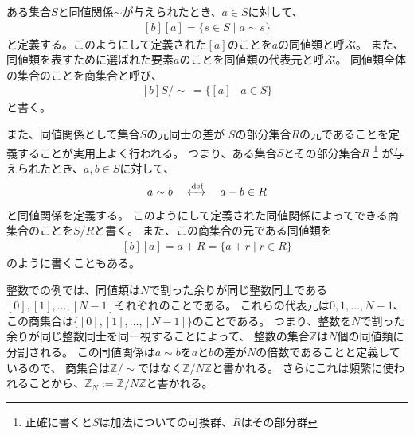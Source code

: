 \documentclass[../master.tex]{subfiles}
\begin{document}
\begin{NoteBox}[title=同値類と商集合]{}
    ある集合$S$と同値関係$\sim$が与えられたとき、$a\in S$に対して、
    \begin{equation}\begin{aligned}[b]
        [a] = \{s\in S \mid a \sim s\}
    \end{aligned}\end{equation}
    と定義する。このようにして定義された$[a]$のことを$a$の同値類と呼ぶ。
    また、同値類を表すために選ばれた要素$a$のことを同値類の代表元と呼ぶ。
    同値類全体の集合のことを商集合と呼び、
    \begin{equation}\begin{aligned}[b]
        S/\sim\, = \{[a] \mid a\in S\}
    \end{aligned}\end{equation}
    と書く。

    また、同値関係として集合$S$の元同士の差が
    $S$の部分集合$R$の元であることを定義することが実用上よく行われる。
    つまり、ある集合$S$とその部分集合$R$
    \footnote{正確に書くと$S$は加法についての可換群、$R$はその部分群}
    が与えられたとき、$a,b\in S$に対して、
    \begin{equation}\begin{aligned}[b]
        a \sim b \quad \xleftrightarrow{\text{def}} \quad a - b \in R
    \end{aligned}\end{equation}
    と同値関係を定義する。
    このようにして定義された同値関係によってできる商集合のことを$S/R$と書く。
    また、この商集合の元である同値類を
    \begin{equation}\begin{aligned}[b]
        [a] = a+R = \{a+r \mid r\in R\}
    \end{aligned}\end{equation}
    のように書くこともある。
\end{NoteBox}

整数での例では、同値類は$N$で割った余りが同じ整数同士である$[0], [1], \ldots, [N-1]$それぞれのことである。
これらの代表元は$0, 1, \ldots, N-1$、
この商集合は$\{[0],[1],\ldots, [N-1]\}$のことである。
つまり、整数を$N$で割った余りが同じ整数同士を同一視することによって、
整数の集合$\mathbb{Z}$は$N$個の同値類に分割される。
この同値関係は$a \sim b$を$a$と$b$の差が$N$の倍数であることと定義しているので、
商集合は$\mathbb{Z}/\sim$ではなく$\mathbb{Z}/N\mathbb{Z}$と書かれる。
さらにこれは頻繁に使われることから、$\mathbb{Z}_N := \mathbb{Z}/N\mathbb{Z}$と書かれる。
\end{document}
